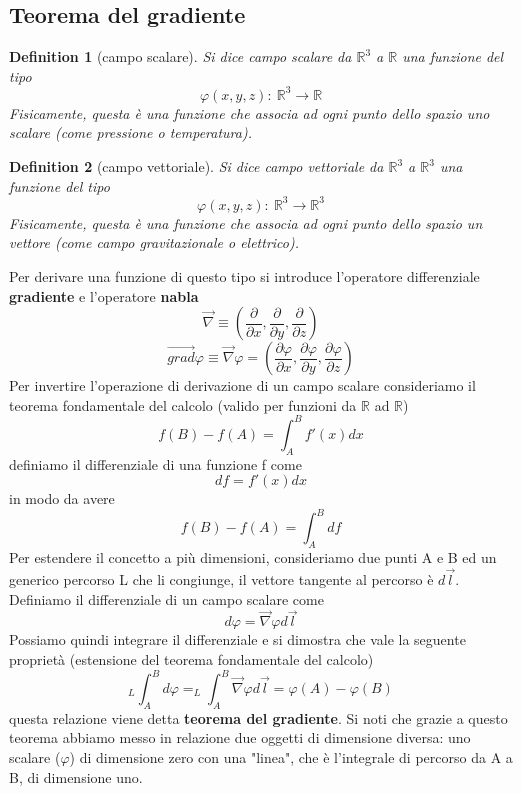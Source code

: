 \documentclass[10pt,a4paper]{article}
\newtheorem{definition}{Definition}
\begin{document}
\subsection{Teorema del gradiente}
\begin{definition}[campo scalare]
	Si dice campo scalare da \(\mathbb{R}^3\) a \(\mathbb{R}\) una funzione del tipo 
	\[\varphi(x, y, z):\ \mathbb{R}^3\rightarrow \mathbb{R}\]
	Fisicamente, questa è una funzione che associa ad ogni punto dello spazio uno scalare (come pressione o temperatura).
\end{definition}
\begin{definition}[campo vettoriale]
	Si dice campo vettoriale da \(\mathbb{R}^3\) a \(\mathbb{R}^3\) una funzione del tipo 
	\[\varphi(x, y, z):\ \mathbb{R}^3\rightarrow \mathbb{R}^3\]
	Fisicamente, questa è una funzione che associa ad ogni punto dello spazio un vettore (come campo gravitazionale o elettrico).
\end{definition}
Per derivare una funzione di questo tipo si introduce l'operatore differenziale \textbf{gradiente} e l'operatore \textbf{nabla}
\[\vec{\nabla} \equiv \left(\frac{\partial}{\partial x}, \frac{\partial }{\partial y}, \frac{\partial }{\partial z}\right)\]
\[\vec{grad}\varphi \equiv \vec{\nabla}\varphi = \left(\frac{\partial\varphi }{\partial x}, \frac{\partial\varphi }{\partial y}, \frac{\partial\varphi }{\partial z}\right)\]
Per invertire l'operazione di derivazione di un campo scalare consideriamo il teorema fondamentale del calcolo (valido per funzioni da \(\mathbb{R}\) ad \(\mathbb{R}\))
\[f(B)-f(A) = \int_{A}^{B}f'(x)dx\]
definiamo il differenziale di una funzione f come
\[df = f'(x)dx\] 
in modo da avere
\[f(B)-f(A) = \int_{A}^{B}df\]
Per estendere il concetto a più dimensioni, consideriamo due punti A e B ed un generico percorso L che li congiunge, il vettore tangente al percorso è $d\vec{l}$.  Definiamo il differenziale di un campo scalare come 
\[d\varphi = \vec{\nabla}\varphi d\vec{l}\]
Possiamo quindi integrare il differenziale e si dimostra che vale la seguente proprietà (estensione del teorema fondamentale del calcolo)
\[_L\int_{A}^{B}d\varphi = _L\int_{A}^{B}\vec{\nabla}\varphi d\vec{l} = \varphi(A)-\varphi(B)\]
questa relazione viene detta \textbf{teorema del gradiente}. Si noti che grazie a questo teorema abbiamo messo in relazione due oggetti di dimensione diversa: uno scalare (\(\varphi\)) di dimensione zero con una "linea", che è l'integrale di percorso da A a B, di dimensione uno.
\end{document}

